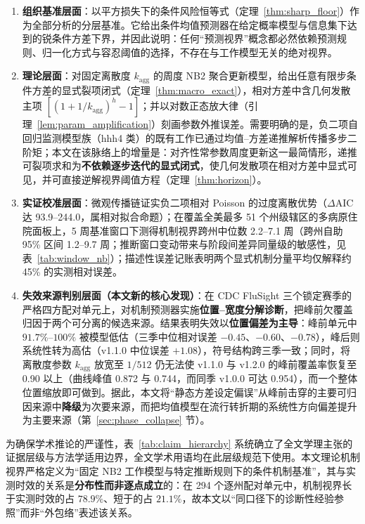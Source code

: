 \documentclass[10pt,UTF8,a4paper,zihao=-4]{ctexart}
\theoremstyle{plain}
\theoremstyle{definition}
\theoremstyle{remark}
\begin{document}
\begin{enumerate}
\item \textbf{组织基准层面}：以平方损失下的条件风险恒等式（定理~\ref{thm:sharp_floor}）作为全部分析的分层基准。它给出条件均值预测器在给定概率模型与信息集下达到的锐条件方差下界，并因此说明：任何“预测视界”概念都必然依赖预测规则、归一化方式与容忍阈值的选择，不存在与工作模型无关的绝对视界。
\item \textbf{理论层面}：对固定离散度 $k_{\text{agg}}$ 的周度 NB2 聚合更新模型，给出任意有限步条件方差的显式裂项闭式（定理~\ref{thm:macro_exact}），相对方差中含几何发散主项 $[(1+1/k_{\text{agg}})^h-1]$；并以对数正态放大律（引理~\ref{lem:param_amplification}）刻画参数外推误差。需要明确的是，负二项自回归监测模型族（hhh4 类）的既有工作已通过均值--方差递推解析传播多步二阶矩\citep{held2005statistical, held2017monitoring, bracher2022endemic}；本文在该脉络上的增量是：对齐性常参数周度更新这一最简情形，递推可裂项求和为\textbf{不依赖逐步迭代的显式闭式}，使几何发散项在相对方差中显式可见，并可直接逆解视界阈值方程（定理~\ref{thm:horizon}）。
\item \textbf{实证校准层面}：微观传播链证实负二项相对 Poisson 的过度离散优势（$\Delta\text{AIC}$ 达 93.9--244.0，属相对拟合命题）；在覆盖全美最多 51 个州级辖区的多病原住院面板上，5 周基准窗口下测得机制视界跨州中位数 2.2--7.1 周（跨州自助 95\% 区间 1.2--9.7 周；推断窗口变动带来与阶段间差异同量级的敏感性，见表~\ref{tab:window_nb}）；描述性误差记账表明两个显式机制分量平均仅解释约 45\% 的实测相对误差。
\item \textbf{失效来源判别层面（本文新的核心发现）}：在 CDC FluSight 三个锁定赛季的严格四方配对单元上，对机制预测器实施\textbf{位置--宽度分解诊断}，把峰前欠覆盖归因于两个可分离的候选来源。结果表明失效以\textbf{位置偏差为主导}：峰前单元中 $91.7\%\text{--}100\%$ 被模型低估（三季中位相对误差 $-0.45$、$-0.60$、$-0.78$），峰后则系统性转为高估（v1.1.0 中位误差 $+1.08$），符号结构跨三季一致；同时，将离散度参数 $k_{\text{agg}}$ 放宽至 $1/512$ 仍无法使 v1.1.0 与 v1.2.0 的峰前覆盖率恢复至 0.90 以上（曲线峰值 0.872 与 0.744，而同季 v1.0.0 可达 0.954），而一个整体位置缩放即可做到。据此，本文将“静态方差设定偏误”从峰前击穿的主要可归因来源中\textbf{降级}为次要来源，而把均值模型在流行转折期的系统性方向偏差提升为主要来源（第~\ref{sec:phase_collapse} 节）。
\end{enumerate}

为确保学术推论的严谨性，表~\ref{tab:claim_hierarchy} 系统确立了全文学理主张的证据层级与方法学适用边界，全文学术用语均在此层级规范下使用。本文理论机制视界严格定义为“固定 NB2 工作模型与特定推断规则下的条件机制基准”，其与实测时效的关系是\textbf{分布性而非逐点成立}的：在 294 个逐州配对单元中，机制视界长于实测时效的占 $78.9\%$、短于的占 $21.1\%$，故本文以“同口径下的诊断性经验参照”而非“外包络”表述该关系。
\end{document}
